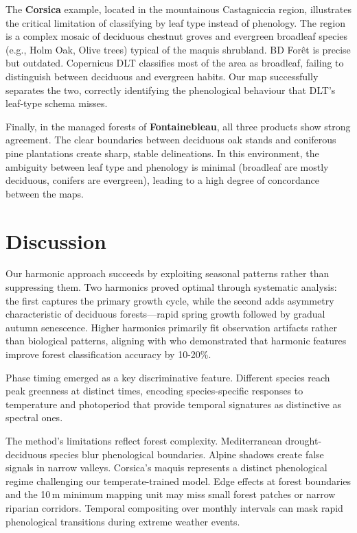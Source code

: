 \documentclass[utf8]{FrontiersinHarvard}
\begin{document}
The \textbf{Corsica} example, located in the mountainous Castagniccia region, illustrates the critical limitation of classifying by leaf type instead of phenology. The region is a complex mosaic of deciduous chestnut groves and evergreen broadleaf species (e.g., Holm Oak, Olive trees) typical of the maquis shrubland. BD Forêt is precise but outdated. Copernicus DLT classifies most of the area as broadleaf, failing to distinguish between deciduous and evergreen habits. Our map successfully separates the two, correctly identifying the phenological behaviour that DLT's leaf-type schema misses.

Finally, in the managed forests of \textbf{Fontainebleau}, all three products show strong agreement. The clear boundaries between deciduous oak stands and coniferous pine plantations create sharp, stable delineations. In this environment, the ambiguity between leaf type and phenology is minimal (broadleaf are mostly deciduous, conifers are evergreen), leading to a high degree of concordance between the maps.

\section{Discussion}

Our harmonic approach succeeds by exploiting seasonal patterns rather than suppressing them. Two harmonics proved optimal through systematic analysis: the first captures the primary growth cycle, while the second adds asymmetry characteristic of deciduous forests—rapid spring growth followed by gradual autumn senescence. Higher harmonics primarily fit observation artifacts rather than biological patterns, aligning with \citet{Wilson2018} who demonstrated that harmonic features improve forest classification accuracy by 10-20\%.

Phase timing emerged as a key discriminative feature. Different species reach peak greenness at distinct times, encoding species-specific responses to temperature and photoperiod that provide temporal signatures as distinctive as spectral ones.

The method's limitations reflect forest complexity. Mediterranean drought-deciduous species blur phenological boundaries. Alpine shadows create false signals in narrow valleys. Corsica's maquis represents a distinct phenological regime challenging our temperate-trained model. Edge effects at forest boundaries and the 10\,m minimum mapping unit may miss small forest patches or narrow riparian corridors. Temporal compositing over monthly intervals can mask rapid phenological transitions during extreme weather events.
\end{document}
